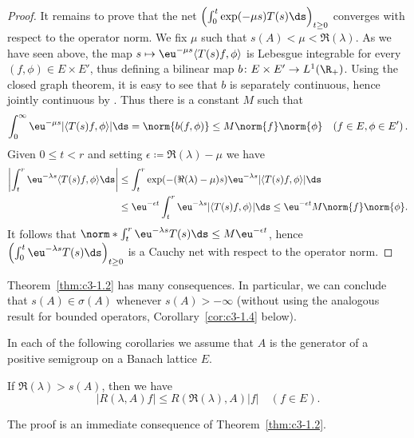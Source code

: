 \begin{proof}
It remains to prove that the net $\left(\int_{0}^t \exp(-\mu s)T(s) \ds \right)_{t\geq 0}$ converges with respect to the operator norm.
We fix $\mu$ such that $s(A) < \mu < \Re(\lambda)$.
As we have seen above, the map $s \mapsto \eu^{-\mu s}\langle T(s)f,\phi\rangle$ is Lebesgue integrable for every $(f,\phi) \in E \times E'$, thus defining a bilinear map $b \colon E \times E' \to L^1(\R _{+})$.
Using the closed graph theorem, it is easy to see that $b$ is separately continuous, hence jointly continuous by \textcite[III.Theorem~5.1]{schaefer:1966}.
Thus there is a constant $M$ such that
\begin{equation}\label{eq:c3-1.4}
	\int_{0}^{\infty} \eu^{-\mu s}|\langle T(s)f,\phi\rangle| \ds  = \norm{b(f,\phi)} \leq M\norm{f}\norm{\phi} \quad (f \in E, \phi \in E')\,.
\end{equation}
Given $0 \leq t < r$ and setting $\epsilon \coloneqq \Re(\lambda) - \mu$ we have
\begin{align*}
	\left|\int_{t}^r \eu^{-\lambda s}\langle T(s)f,\phi\rangle \ds \right| &\leq \int_{t}^r \exp(-(\Re(\lambda)-\mu)s)\eu^{-\lambda s}|\langle T(s)f,\phi\rangle| \ds  \\
	&\leq \eu^{-\epsilon t}\int_{t}^r \eu^{-\lambda s}|\langle T(s)f,\phi\rangle| \ds  \leq \eu^{-\epsilon t} M\norm{f}\norm{\phi}.
\end{align*}
It follows that $\norm*{\int_{t}^r \eu^{-\lambda s}T(s) \ds } \leq M\eu^{-\epsilon t}$, hence $\left(\int_{0}^t \eu^{-\lambda s}T(s) \ds \right)_{t\geq 0}$ is a Cauchy net with respect to the operator norm.
\end{proof}
Theorem~\ref{thm:c3-1.2} has many consequences.
In particular, we can conclude that $s(A) \in \sigma(A)$ whenever $s(A) > -\infty$ (without using the analogous result for bounded operators, \cf Corollary~\ref{cor:c3-1.4} below).

In each of the following corollaries we assume that $A$ is the generator of a positive semigroup on a Banach lattice $E$.

\begin{corollary}\label{cor:c3-1.3}
If\/ $\Re(\lambda) > s(A)$, then we have
\begin{equation}\label{eq:c3-1.5}
	|R(\lambda,A)f| \leq R(\Re(\lambda),A) |f| \quad (f \in E).
\end{equation}
\end{corollary}
The proof is an immediate consequence of Theorem~\ref{thm:c3-1.2}.

